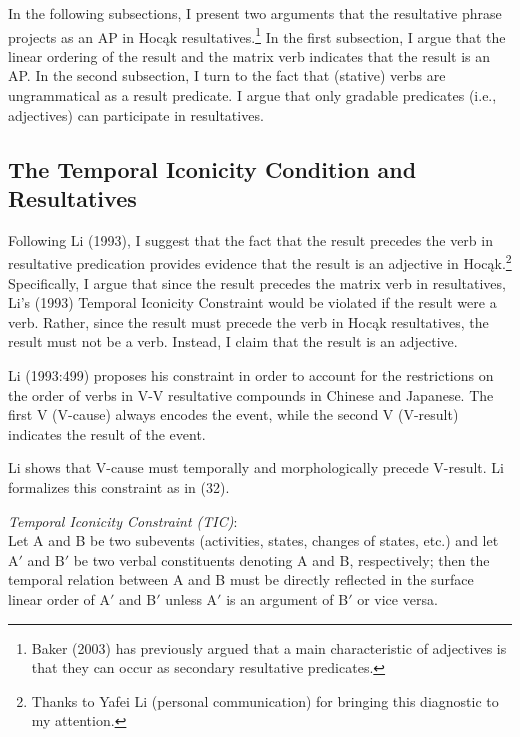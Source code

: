 \documentclass[output=paper]{LSP/langsci}
\begin{document}
In the following subsections, I present two arguments that the resultative phrase projects as an AP in Hocąk resultatives.\footnote{Baker (2003) has previously argued that a main characteristic of adjectives is that they can occur as secondary resultative predicates.} In the first subsection, I argue that the linear ordering of the result and the matrix verb indicates that the result is an AP. In the second subsection, I turn to the fact that (stative) verbs are ungrammatical as a result predicate. I argue that only gradable predicates (i.e., adjectives) can participate in resultatives. 

\subsection{The Temporal Iconicity Condition and Resultatives}

Following Li (1993), I suggest that the fact that the result precedes the verb in resultative predication provides evidence that the result is an adjective in Hocąk.\footnote{Thanks to Yafei Li (personal communication) for bringing this diagnostic to my attention.} Specifically, I argue that since the result precedes the matrix verb in resultatives, Li's (1993) Temporal Iconicity Constraint would be violated if the result were a verb. Rather, since the result must precede the verb in Hocąk resultatives, the result must not be a verb. Instead, I claim that the result is an adjective.

Li (1993:499) proposes his constraint in order to account for the restrictions on the order of verbs in V-V resultative compounds in Chinese and Japanese. The first V (V-cause) always encodes the event, while the second V (V-result) indicates the result of the event. 

Li shows that V-cause must temporally and morphologically precede V-result. Li formalizes this constraint as in (32).

\begin{exe}

\ex
 \emph{Temporal Iconicity Constraint (TIC)}:\\
 Let A and B be two subevents (activities, states, changes of states, etc.) and let A$'$ and B$'$ be two verbal constituents denoting A and B, respectively; then the temporal relation between A and B must be directly reflected in the surface linear order of A$'$ and B$'$ unless A$'$ is an argument of B$'$ or vice versa.
 
 \end{exe}
\end{document}
